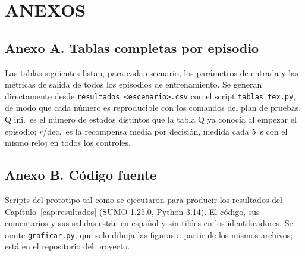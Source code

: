 \chapter*{\center \Large ANEXOS}

\section*{Anexo A. Tablas completas por episodio}

Las tablas siguientes listan, para cada escenario, los parámetros de
entrada y las métricas de salida de todos los episodios de
entrenamiento. Se generan directamente desde
\texttt{resultados\_<escenario>.csv} con el script
\texttt{tablas\_tex.py}, de modo que cada número es reproducible con
los comandos del plan de pruebas. Q ini.\ es el número de estados
distintos que la tabla Q ya conocía al empezar el episodio; $r$/dec.\ es
la recompensa media por decisión, medida cada 5~s con el mismo reloj en
todos los controles.






\section*{Anexo B. Código fuente}

Scripts del prototipo tal como se ejecutaron para producir los
resultados del Capítulo~\ref{cap:resultados} (SUMO 1.25.0, Python 3.14).
El código, sus comentarios y sus salidas están en español y sin tildes
en los identificadores. Se omite \texttt{graficar.py}, que solo dibuja
las figuras a partir de los mismos archivos; está en el repositorio del
proyecto.

